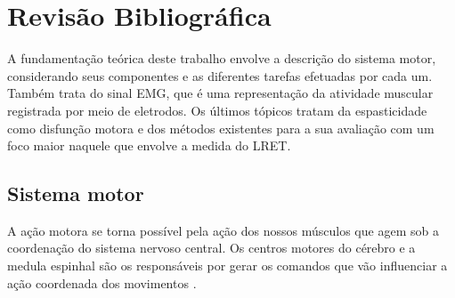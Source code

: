 
\chapter{Revisão Bibliográfica}
\label{cap:revisao}
A fundamentação teórica deste trabalho envolve a descrição do sistema motor, considerando seus componentes e as diferentes tarefas efetuadas por cada um. Também trata do sinal EMG, que é uma representação da atividade muscular registrada por meio de eletrodos. Os últimos tópicos tratam da espasticidade como disfunção motora e dos métodos existentes para a sua avaliação com um foco maior naquele que envolve a medida do LRET.

\section{Sistema motor}
\label{sec:sistema_motor}
A ação motora se torna possível pela ação dos nossos músculos que agem sob a coordenação do sistema nervoso central. Os centros motores do cérebro e a medula espinhal são os responsáveis por gerar os comandos que vão influenciar a ação coordenada dos movimentos \cite{Kandel2013}.
